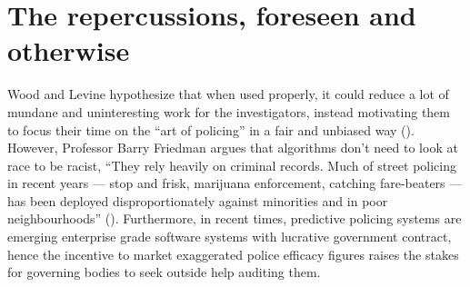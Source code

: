 \documentclass[a4paper,14pt]{extarticle}
\begin{document}
\section*{The repercussions, foreseen and otherwise}
\begin{justifying}
	Wood and Levine hypothesize that when used properly, it could reduce a lot of mundane and uninteresting work for the investigators, instead motivating them to focus their time on the “art of policing” in a fair and unbiased way (\cite{Levine2019}). However, Professor Barry Friedman argues that algorithms don’t need to look at race to be racist, “They rely heavily on criminal records. Much of street policing in recent years — stop and frisk, marijuana enforcement, catching fare-beaters — has been deployed disproportionately against minorities and in poor neighbourhoods” (\cite{Barry2018}).\vspace{1em}
	\newline Furthermore, in recent times, predictive policing systems are emerging enterprise grade software systems with lucrative government contract, hence the incentive to market exaggerated police efficacy figures raises the stakes for governing bodies to seek outside help auditing them.
\end{justifying}
\pagebreak
\end{document}
